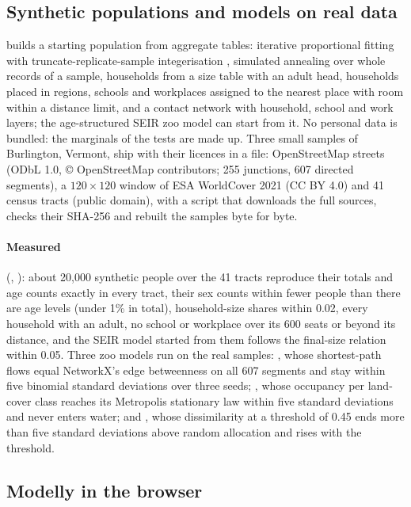 \subsection{Synthetic populations and models on real data}
\label{app:population}

 builds a starting population from aggregate tables: iterative
proportional fitting \citep{deming1940least} with truncate-replicate-sample integerisation
\citep{lovelace2013truncate}, simulated annealing over whole records of a sample, households
from a size table with an adult head, households placed in regions, schools and workplaces
assigned to the nearest place with room within a distance limit, and a contact network with
household, school and work layers; the age-structured SEIR zoo model can start from it. No
personal data is bundled: the marginals of the tests are made up. Three small samples of
Burlington, Vermont, ship with their licences in a  file: OpenStreetMap streets
(ODbL 1.0, © OpenStreetMap contributors; 255 junctions, 607 directed segments), a $120
\times 120$ window of ESA WorldCover 2021 \citep{zanaga2022worldcover} (CC BY 4.0) and 41
census tracts (public domain), with a script that downloads the full sources, checks their
SHA-256 and rebuilt the samples byte for byte.

\paragraph{Measured} (, ): about 20,000 synthetic people
over the 41 tracts reproduce their totals and age counts exactly in every tract, their sex
counts within fewer people than there are age levels (under 1\% in total), household-size
shares within 0.02, every household with an adult, no school or workplace over its 600
seats or beyond its distance, and the SEIR model started from them follows the final-size
relation within 0.05. Three zoo models run on the real samples: , whose
shortest-path flows equal NetworkX's edge betweenness on all 607 segments and stay within
five binomial standard deviations over three seeds; , whose
occupancy per land-cover class reaches its Metropolis stationary law within five standard
deviations and never enters water; and , whose dissimilarity at a
threshold of 0.45 ends more than five standard deviations above random allocation and rises
with the threshold.

\subsection{Modelly in the browser}
\label{app:browser}

